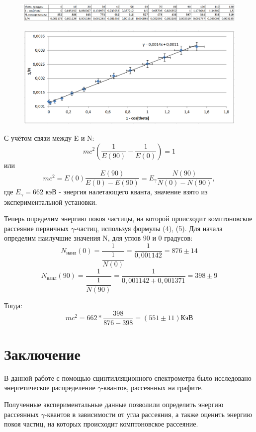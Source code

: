 \documentclass[a4paper, 12pt]{article}
\begin{document}
    \begin{figure}[H]
        \centering
        \includegraphics[width=1\linewidth]{res/3.png}
    \end{figure}
    \begin{figure}[H]
        \centering
        \includegraphics[width=0.7\linewidth]{res/4.png}
    \end{figure}

    С учётом связи между E и N:
    \begin{equation}
        mc^2 (\frac{1}{E(90)} - \frac{1}{E(0)}) = 1
    \end{equation}
    или
    \begin{equation}
        mc^2 = E(0) \frac{E(90)}{E(0) - E(90)} = E_{\gamma} \frac{N(90)}{N(0) - N(90)},
    \end{equation}
    где $E_{\gamma} = 662$ кэВ - энергия налетающего кванта, значение взято из экспериментальной установки.

    Теперь определим энергию покоя частицы, на которой происходит комптоновское рассеяние первичных $\gamma$-частиц,
    используя формулы (4), (5). Для начала определим наилучшие значения N, для углов 90 и 0 градусов:
    \[
        N_{наил}(0) = \dfrac{1}{\dfrac{1}{N(0)}} = \dfrac{1}{0,001142} = 876 \pm 14
    \]
    \[
        N_{наил}(90) = \dfrac{1}{\dfrac{1}{N(90)}} = \dfrac{1}{0,001142 + 0,001371} = 398 \pm 9
    \]

    Тогда:
    \[
        mc^2 = 662*\dfrac{398}{876 - 398} = (551 \pm 11) КэВ
    \]


\section{Заключение}
    В данной работе с помощью сцинтилляционного спектрометра 
    было исследовано энергетическое распределение $\gamma$-квантов, рассеянных на графите. 

    Полученные экспериментальные данные позволили определить энергию рассеянных 
    $\gamma$-квантов в зависимости от угла рассеяния, 
    а также оценить энергию покоя частиц, на которых происходит комптоновское рассеяние. 
\end{document}
